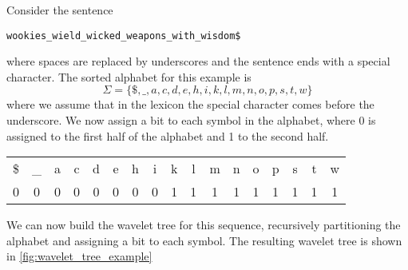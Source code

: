 \begin{example}
    Consider the sentence
    \begin{center}
        \texttt{wookies\_wield\_wicked\_weapons\_with\_wisdom\$}
    \end{center}
    where spaces are replaced by underscores and the sentence ends with a special character. The sorted alphabet for this example is
    \[
        \Sigma = \{\$, \_, a, c, d, e, h, i, k, l, m, n, o, p, s, t, w \}
    \]
    where we assume that in the lexicon the special character comes before the underscore. We now assign a bit to each symbol in the alphabet, where 0 is assigned to the first half of the alphabet and 1 to the second half.

    \begin{tabular}{*{17}{c}}
        \$                        & \_                        & a                         & c                         & d                         & e                         & h                         & i                         & k                         & l                         & m                         & n                         & o                         & p                         & s                         & t                         & w                         \\
        \textcolor{purple!100}{0} & \textcolor{purple!100}{0} & \textcolor{purple!100}{0} & \textcolor{purple!100}{0} & \textcolor{purple!100}{0} & \textcolor{purple!100}{0} & \textcolor{purple!100}{0} & \textcolor{purple!100}{0} & \textcolor{purple!100}{1} & \textcolor{purple!100}{1} & \textcolor{purple!100}{1} & \textcolor{purple!100}{1} & \textcolor{purple!100}{1} & \textcolor{purple!100}{1} & \textcolor{purple!100}{1} & \textcolor{purple!100}{1} & \textcolor{purple!100}{1} \\
    \end{tabular}

    \noindent We can now build the wavelet tree for this sequence, recursively partitioning the alphabet and assigning a bit to each symbol. The resulting wavelet tree is shown in \autoref{fig:wavelet_tree_example}

\end{example}

